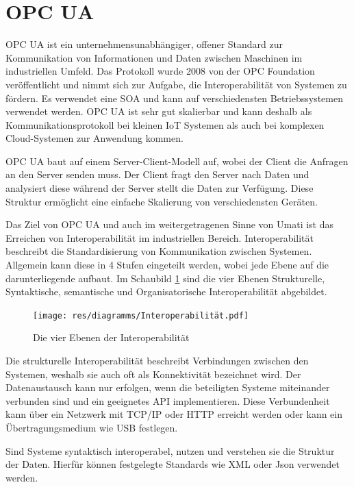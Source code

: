 \documentclass[a4paper, 12pt, oneside]{scrbook}
\begin{document}
	
	
	\section{OPC UA}
	
	 \ac{OPC UA} ist ein unternehmensunabhängiger, offener Standard zur Kommunikation von Informationen und Daten zwischen Maschinen im industriellen Umfeld. Das Protokoll wurde 2008 von der OPC Foundation veröffentlicht und nimmt sich zur Aufgabe, die Interoperabilität von Systemen zu fördern. Es verwendet eine \ac{SOA} und kann auf verschiedensten Betriebssystemen verwendet werden. OPC UA ist sehr gut skalierbar und kann deshalb als Kommunikationsprotokoll bei kleinen \ac{IoT} Systemen als auch bei komplexen Cloud-Systemen zur Anwendung kommen. 
	 
	 OPC UA baut auf einem Server-Client-Modell auf, wobei der Client die Anfragen an den Server senden muss. Der Client fragt den Server nach Daten und analysiert diese während der Server stellt die Daten zur Verfügung. Diese Struktur ermöglicht eine einfache Skalierung von verschiedensten Geräten. 
	 
	 Das Ziel von OPC UA und auch im weitergetragenen Sinne von Umati ist das Erreichen von Interoperabilität im industriellen Bereich. Interoperabilität beschreibt die Standardisierung von Kommunikation zwischen Systemen. Allgemein kann diese in 4 Stufen eingeteilt werden, wobei jede Ebene auf die darunterliegende aufbaut. Im Schaubild \ref{fig:Interoperabilität} sind die vier Ebenen Strukturelle, Syntaktische, semantische und Organisatorische Interoperabilität abgebildet.
	 
	 \begin{figure}[H]
	 	\centering
	 	\texttt{[image: res/diagramms/Interoperabilität.pdf]}
	 	\caption{Die vier Ebenen der Interoperabilität}
	 	\label{fig:Interoperabilität}
	 \end{figure}
	 
	 Die strukturelle Interoperabilität beschreibt Verbindungen zwischen den Systemen, weshalb sie auch oft als Konnektivität bezeichnet wird. Der Datenaustausch kann nur erfolgen, wenn die beteiligten Systeme miteinander verbunden sind und ein geeignetes \ac{API} implementieren. Diese Verbundenheit kann über ein Netzwerk mit TCP/IP oder HTTP erreicht werden oder kann ein Übertragungsmedium wie USB festlegen. \cite{mielebacher_verteilte_2021}
	 
	 Sind Systeme syntaktisch interoperabel, nutzen und verstehen sie die Struktur der Daten. Hierfür können festgelegte Standards wie XML oder Json verwendet werden. \cite{mielebacher_verteilte_2021-1}
	 
\end{document}
